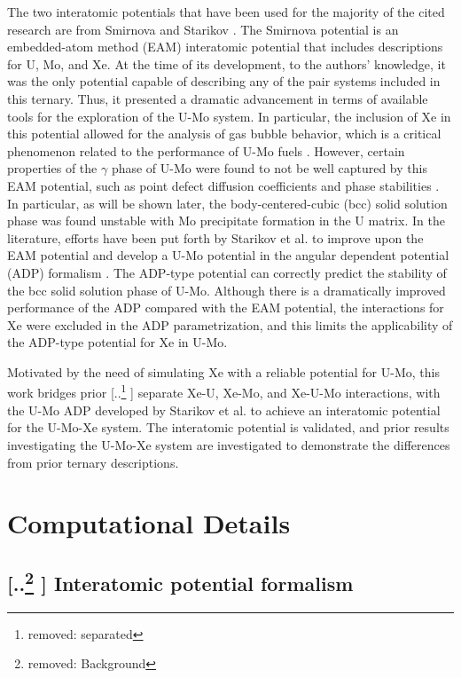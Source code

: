 \documentclass[review]{elsarticle}
\providecommand{\DIFaddtex}[1]{{\protect\color{blue} \sf #1}} %
\providecommand{\DIFdeltex}[1]{{\protect\color{red} [..\footnote{removed: #1} ]}} %
\providecommand{\DIFaddbegin}{} %
\providecommand{\DIFaddend}{} %
\providecommand{\DIFdelbegin}{} %
\providecommand{\DIFdelend}{} %
\providecommand{\DIFadd}[1]{\texorpdfstring{\DIFaddtex{#1}}{#1}} %
\providecommand{\DIFdel}[1]{\texorpdfstring{\DIFdeltex{#1}}{}} %
\newcommand{\DIFscaledelfig}{0.5}
\newlength{\DIFdelgraphicswidth} %
\newlength{\DIFdelgraphicsheight} %
\newcommand{\DIFaddincludegraphics}[2][]{{\color{blue}\fbox{\DIFOincludegraphics[#1]{#2}}}} %
\newcommand{\DIFdelincludegraphics}[2][]{%
\sbox{\DIFdelgraphicsbox}{\DIFOincludegraphics[#1]{#2}}%
\settoboxwidth{\DIFdelgraphicswidth}{\DIFdelgraphicsbox} %
\settoboxtotalheight{\DIFdelgraphicsheight}{\DIFdelgraphicsbox} %
\scalebox{\DIFscaledelfig}{%
\parbox[b]{\DIFdelgraphicswidth}{\usebox{\DIFdelgraphicsbox}\\[-\baselineskip] \rule{\DIFdelgraphicswidth}{0em}}\llap{\resizebox{\DIFdelgraphicswidth}{\DIFdelgraphicsheight}{%
\setlength{\unitlength}{\DIFdelgraphicswidth}%
\begin{picture}(1,1)%
\thicklines\linethickness{2pt} %
{\color[rgb]{1,0,0}\put(0,0){\framebox(1,1){}}}%
{\color[rgb]{1,0,0}\put(0,0){\line( 1,1){1}}}%
{\color[rgb]{1,0,0}\put(0,1){\line(1,-1){1}}}%
\end{picture}%
}\hspace*{3pt}}} %
} %
\DeclareRobustCommand{\DIFaddbegin}{\DIFOaddbegin \let\includegraphics\DIFaddincludegraphics} %
\DeclareRobustCommand{\DIFaddend}{\DIFOaddend \let\includegraphics\DIFOincludegraphics} %
\DeclareRobustCommand{\DIFdelbegin}{\DIFOdelbegin \let\includegraphics\DIFdelincludegraphics} %
\DeclareRobustCommand{\DIFdelend}{\DIFOaddend \let\includegraphics\DIFOincludegraphics} %
\begin{document}
The two interatomic potentials that have been used for the majority of the cited research are from Smirnova \cite{smirnovaUMoXe} and Starikov \cite{starikov2018}. The Smirnova potential is an embedded-atom method (EAM) \cite{daw1984,daw1993} interatomic potential that includes descriptions for U, Mo, and Xe. At the time of its development, to the authors' knowledge, it was the only potential capable of describing any of the pair systems included in this ternary. Thus, it presented a dramatic advancement in terms of available tools for the exploration of the U-Mo system. In particular, the inclusion of Xe in this potential allowed for the analysis of gas bubble behavior, which is a critical phenomenon related to the performance of U-Mo fuels \cite{kim2013A,meyer2014}. However, certain properties of the $\gamma$ phase of U-Mo were found to not be well captured by this EAM potential, such as point defect diffusion coefficients and phase stabilities \cite{smirnovaUMoXe,starikov2018}. In particular, as will be shown later, the body-centered-cubic (bcc) solid solution phase was found unstable with Mo precipitate formation in the U matrix. In the literature, efforts have been put forth by Starikov et al. \cite{starikov2018} to improve upon the EAM potential and develop a U-Mo potential in the angular dependent potential (ADP) formalism \cite{mishin2005}. The ADP-type potential can correctly predict the stability of the bcc solid solution phase of U-Mo. Although there is a dramatically improved performance of the ADP compared with the EAM potential, the interactions for Xe were excluded in the ADP parametrization, and this limits the applicability of the ADP-type potential for Xe in U-Mo.

Motivated by the need of simulating Xe with a reliable potential for U-Mo, this work bridges prior \DIFdelbegin \DIFdel{separated }\DIFdelend \DIFaddbegin \DIFadd{separate }\DIFaddend Xe-U, Xe-Mo, and Xe-U-Mo interactions, with the U-Mo ADP developed by Starikov et al. \cite{starikov2018} to achieve an interatomic potential for the U-Mo-Xe system. The interatomic potential is validated, and prior results investigating the U-Mo-Xe system are investigated to demonstrate the differences from prior ternary descriptions.

\section{Computational Details}

\subsection{\DIFdelbegin \DIFdel{Background}\DIFdelend \DIFaddbegin \DIFadd{Interatomic potential formalism}\DIFaddend }
\end{document}
